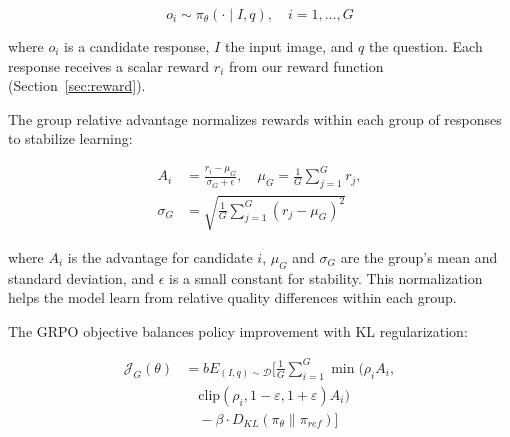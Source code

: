 \documentclass[11pt]{article}
\begin{document}
\begin{equation}
o_i \sim \pi_\theta(\cdot \mid I, q), \quad i = 1, \ldots, G
\label{eq:sample}
\end{equation}

\noindent where $o_i$ is a candidate response, $I$ the input image, and $q$ the question. Each response receives a scalar reward $r_i$ from our reward function (Section~\ref{sec:reward}).

\noindent The group relative advantage normalizes rewards within each group of responses to stabilize learning:

\begin{equation}
\begin{aligned}
A_i &= \frac{r_i - \mu_G}{\sigma_G + \epsilon}, \quad
\mu_G = \frac{1}{G}\sum_{j=1}^G r_j, \\
\sigma_G &= \sqrt{\frac{1}{G}\sum_{j=1}^G (r_j - \mu_G)^2}
\end{aligned}
\label{eq:advantage}
\end{equation}

\noindent where $A_i$ is the advantage for candidate $i$, $\mu_G$ and $\sigma_G$ are the group’s mean and standard deviation, and $\epsilon$ is a small constant for stability. This normalization helps the model learn from relative quality differences within each group.

The GRPO objective balances policy improvement with KL regularization:


\begin{equation}
\begin{aligned}
\mathcal{J}_G(\theta) &= \mathbb{}b{E}_{(I,q)\sim\mathcal{D}} \Bigg[
\frac{1}{G} \sum_{i=1}^G \min\big( \rho_i A_i, \\
&\quad \text{clip}(\rho_i, 1-\varepsilon, 1+\varepsilon) A_i \big) \\
&\quad - \beta \cdot D_{KL}(\pi_\theta \| \pi_{ref}) \Bigg]
\end{aligned}
\label{eq:grpo_objective}
\end{equation}
\end{document}
